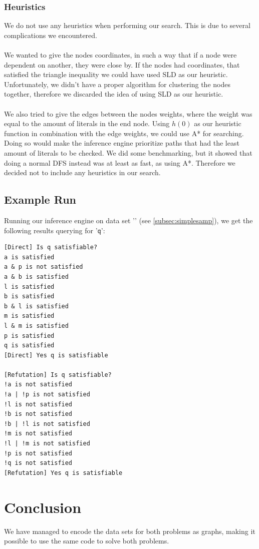 \documentclass[11pt]{article}
\begin{document}
\subsubsection{Heuristics}
We do not use any heuristics when performing our search. This is due to several complications we encountered.\\
\\
We wanted to give the nodes coordinates, in such a way that if a node were dependent on another, they were close by. If the nodes had coordinates, that satisfied the triangle inequality we could have used SLD as our heuristic. Unfortunately, we didn't have a proper algorithm for clustering the nodes together, therefore we discarded the idea of using SLD as our heuristic.\\
\\
We also tried to give the edges between the nodes weights, where the weight was equal to the amount of literals in the end node. Using $h(0)$ as our heuristic function in combination with the edge weights, we could use A* for searching. Doing so would make the inference engine prioritize paths that had the least amount of literals to be checked. We did some benchmarking, but it showed that doing a normal DFS instead was at least as fast, as using A*. Therefore we decided not to include any heuristics in our search.

\subsection{Example Run}
Running our inference engine on data set '' (see \ref{subsec:simplesamp}), we get the following results querying for '{\tt q}':
\begin{lstlisting}[style=logoutput]
[Direct] Is q satisfiable?
a is satisfied
a & p is not satisfied
a & b is satisfied
l is satisfied
b is satisfied
b & l is satisfied
m is satisfied
l & m is satisfied
p is satisfied
q is satisfied
[Direct] Yes q is satisfiable

[Refutation] Is q satisfiable?
!a is not satisfied
!a | !p is not satisfied
!l is not satisfied
!b is not satisfied
!b | !l is not satisfied
!m is not satisfied
!l | !m is not satisfied
!p is not satisfied
!q is not satisfied
[Refutation] Yes q is satisfiable
\end{lstlisting}

\section{Conclusion}
We have managed to encode the data sets for both problems as graphs, making it possible to use the same code to solve both problems.
\end{document}
